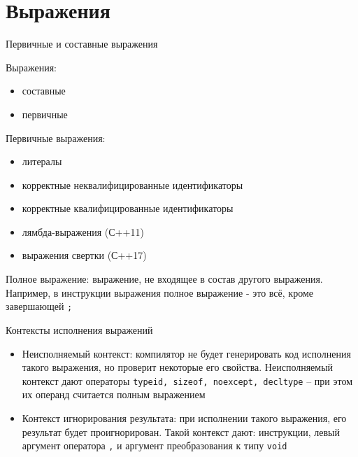 \documentclass[unknownkeysallowed,xcolor=table]{beamer}
\begin{document}

\section{Выражения}

\begin{frame}{Первичные и составные выражения}

Выражения:
\begin{itemize}
  \item составные
  \item первичные
\end{itemize}

\vspace{0.5em}
Первичные выражения:
\begin{itemize}
  \item литералы
  \item корректные неквалифицированные идентификаторы
  \item корректные квалифицированные идентификаторы
  \item лямбда-выражения (С++11)
  \item выражения свертки (С++17)
\end{itemize}

\vspace{0.5em}
Полное выражение: выражение, не входящее в состав другого выражения.
Например, в инструкции выражения полное выражение - это всё, кроме завершающей \lstinline[basicstyle=\ttfamily\small]{;}

\end{frame}

\begin{frame}{Контексты исполнения выражений}

\begin{itemize}
  \item Неисполняемый контекст: компилятор не будет генерировать код исполнения такого выражения, но проверит некоторые его свойства.
  Неисполняемый контекст дают операторы \lstinline[basicstyle=\ttfamily\small]{typeid, sizeof, noexcept, decltype} -- при этом их операнд считается полным выражением \vspace{2em}
  
  \item Контекст игнорирования результата: при исполнении такого выражения, его результат будет проигнорирован.
  Такой контекст дают: инструкции, левый аргумент оператора \lstinline[basicstyle=\ttfamily\small]{,} и аргумент преобразования к типу \lstinline[basicstyle=\ttfamily\small]{void}
\end{itemize}

\end{frame}
\end{document}
